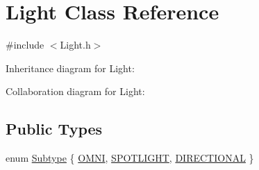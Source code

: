 \hypertarget{classLight}{}\section{Light Class Reference}
\label{classLight}


{\ttfamily \#include $<$Light.\+h$>$}



Inheritance diagram for Light\+:


Collaboration diagram for Light\+:
\subsection*{Public Types}
\begin{DoxyCompactItemize}
\item 
enum \hyperlink{classLight_a7b5feeb01dd53961e0e523f3d2f5fa7f}{Subtype} \{ \hyperlink{classLight_a7b5feeb01dd53961e0e523f3d2f5fa7fa82b3eb15e901d2bb0a11c613f2d02b52}{O\+M\+NI}, 
\hyperlink{classLight_a7b5feeb01dd53961e0e523f3d2f5fa7faeb3694a08c662b54cbe4548af2fc7c4d}{S\+P\+O\+T\+L\+I\+G\+HT}, 
\hyperlink{classLight_a7b5feeb01dd53961e0e523f3d2f5fa7fa308ea96a5b3e191559504e7ac0141eba}{D\+I\+R\+E\+C\+T\+I\+O\+N\+AL}
 \}
\end{DoxyCompactItemize}
